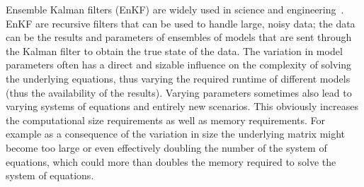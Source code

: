 \documentclass[conference,final]{IEEEtran}
\begin{document}


Ensemble Kalman filters (EnKF) are widely used in science and
engineering~\cite{DataAssim, KalmanPaper}. EnKF are recursive filters
that can be used to handle large, noisy data; the data can be the
results and parameters of ensembles of models that are sent through
the Kalman filter to obtain the true state of the data. The variation
in model parameters often has a direct and sizable influence on the
complexity of solving the underlying equations, thus varying the
required runtime of different models (thus the availability of the
results).  Varying parameters sometimes also lead to varying systems
of equations and entirely new scenarios. This obviously increases the
computational size requirements as well as memory requirements.  For
example as a consequence of the variation in size the underlying
matrix might become too large or even effectively doubling the number
of the system of equations, which could more than doubles the memory
required to solve the system of equations.
\end{document}
